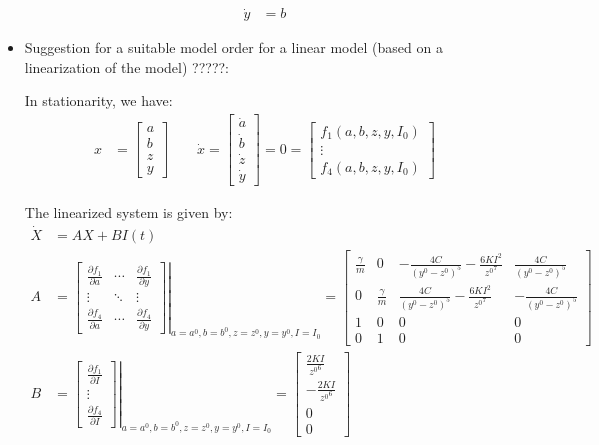 \documentclass[10pt,a4paper]{article}
\begin{document}
\begin{itemize}
\begin{align*}
		\dot{y} &= b
	\end{align*}
	\item Suggestion for a suitable model order for a linear model (based on a linearization of the model) ?????:
	\par In stationarity, we have:
	\begin{align*}
		x &= \begin{bmatrix} a \\ b \\ z \\ y \end{bmatrix} \qquad \dot{x} = \begin{bmatrix} \dot{a} \\ \dot{b} \\ \dot{z} \\ \dot{y} \end{bmatrix} = 0 = \begin{bmatrix} f_{1}(a, b, z, y, I_{0}) \\ \vdots \\ f_{4}(a, b, z, y, I_{0}) \end{bmatrix}
	\end{align*}
	\par The linearized system is given by:
	\begin{align*}
		\dot{X} &= A X + B I(t) \\
		A &= \left. \begin{bmatrix} \frac{\partial f_{1}}{\partial a} & \cdots & \frac{\partial f_{1}}{\partial y} \\ \vdots & \ddots & \vdots \\ \frac{\partial f_{4}}{\partial a} & \cdots & \frac{\partial f_{4}}{\partial y} \end{bmatrix} \right|_{a = a^{0}, b = b^{0}, z = z^{0}, y = y^{0}, I = I_{0}} = \begin{bmatrix} \frac{\gamma}{m} & 0 & - \frac{4 C}{(y^{0} - z^{0})^{5}} - \frac{6 K I^{2}}{{z^{0}}^{7}} & \frac{4 C}{(y^{0} - z^{0})^{5}} \\ 0 & \frac{\gamma}{m} & \frac{4 C}{(y^{0} - z^{0})^{5}} - \frac{6 K I^{2}}{{z^{0}}^{7}} & - \frac{4 C}{(y^{0} - z^{0})^{5}} \\ 1 & 0 & 0 & 0 \\ 0 & 1 & 0 & 0 \end{bmatrix} \\ 
		B &= \left. \begin{bmatrix} \frac{\partial f_{1}}{\partial I} \\ \vdots \\ \frac{\partial f_{4}}{\partial I} \end{bmatrix} \right|_{a = a^{0}, b = b^{0}, z = z^{0}, y = y^{0}, I = I_{0}} = \begin{bmatrix} \frac{2 K I}{{z^{0}}^{6}} \\ - \frac{2 K I}{{z^{0}}^{6}} \\ 0 \\ 0 \end{bmatrix}

\end{align*}
\end{itemize}
\end{document}
